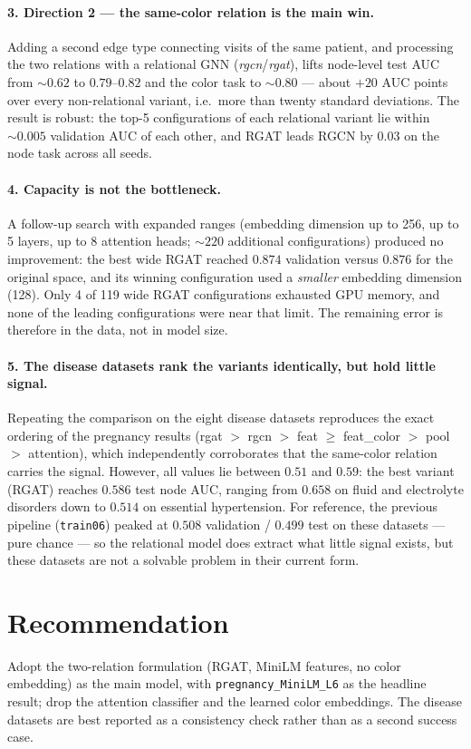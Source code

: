 \documentclass[11pt]{article}
\begin{document}
\paragraph{3. Direction 2 --- the same-color relation is the main win.}
Adding a second edge type connecting visits of the same patient, and processing the two relations with a relational GNN (\emph{rgcn}/\emph{rgat}), lifts node-level test AUC from ${\sim}0.62$ to $0.79$--$0.82$ and the color task to ${\sim}0.80$ --- about $+20$ AUC points over every non-relational variant, i.e.\ more than twenty standard deviations. The result is robust: the top-5 configurations of each relational variant lie within ${\sim}0.005$ validation AUC of each other, and RGAT leads RGCN by $0.03$ on the node task across all seeds.

\paragraph{4. Capacity is not the bottleneck.}
A follow-up search with expanded ranges (embedding dimension up to 256, up to 5 layers, up to 8 attention heads; ${\sim}220$ additional configurations) produced no improvement: the best wide RGAT reached $0.874$ validation versus $0.876$ for the original space, and its winning configuration used a \emph{smaller} embedding dimension (128). Only 4 of 119 wide RGAT configurations exhausted GPU memory, and none of the leading configurations were near that limit. The remaining error is therefore in the data, not in model size.

\paragraph{5. The disease datasets rank the variants identically, but hold little signal.}
Repeating the comparison on the eight disease datasets reproduces the exact ordering of the pregnancy results (rgat $>$ rgcn $>$ feat $\geq$ feat\_color $>$ pool $>$ attention), which independently corroborates that the same-color relation carries the signal. However, all values lie between $0.51$ and $0.59$: the best variant (RGAT) reaches $0.586$ test node AUC, ranging from $0.658$ on fluid and electrolyte disorders down to $0.514$ on essential hypertension. For reference, the previous pipeline (\texttt{train06}) peaked at $0.508$ validation / $0.499$ test on these datasets --- pure chance --- so the relational model does extract what little signal exists, but these datasets are not a solvable problem in their current form.

\section*{Recommendation}
Adopt the two-relation formulation (RGAT, MiniLM features, no color embedding) as the main model, with \texttt{pregnancy\_MiniLM\_L6} as the headline result; drop the attention classifier and the learned color embeddings. The disease datasets are best reported as a consistency check rather than as a second success case.
\end{document}
